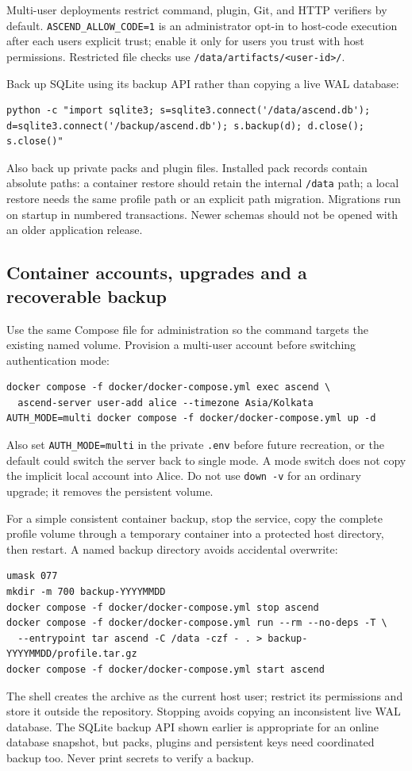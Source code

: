 Multi-user deployments restrict command, plugin, Git, and HTTP verifiers
by default. \texttt{ASCEND\_ALLOW\_CODE=1} is an administrator opt-in to
host-code execution after each user\textquotesingle s explicit trust;
enable it only for users you trust with host permissions. Restricted
file checks use
\texttt{/data/artifacts/\textless{}user-id\textgreater{}/}.

Back up SQLite using its backup API rather than copying a live WAL
database:

\begin{verbatim}
python -c "import sqlite3; s=sqlite3.connect('/data/ascend.db'); d=sqlite3.connect('/backup/ascend.db'); s.backup(d); d.close(); s.close()"
\end{verbatim}

Also back up private packs and plugin files. Installed pack records contain
absolute paths: a container restore should retain the internal \texttt{/data}
path; a local restore needs the same profile path or an explicit path migration.
Migrations run on startup in numbered
transactions. Newer schemas should not be opened with an older
application release.

\subsection{Container accounts, upgrades and a recoverable backup}
Use the same Compose file for administration so the command targets the existing
named volume. Provision a multi-user account before switching authentication mode:
\begin{verbatim}
docker compose -f docker/docker-compose.yml exec ascend \
  ascend-server user-add alice --timezone Asia/Kolkata
AUTH_MODE=multi docker compose -f docker/docker-compose.yml up -d
\end{verbatim}
Also set \texttt{AUTH\_MODE=multi} in the private \texttt{.env} before future
recreation, or the default could switch the server back to single mode.
A mode switch does not copy the implicit local account into Alice. Do not use
\texttt{down -v} for an ordinary upgrade; it removes the persistent volume.

For a simple consistent container backup, stop the service, copy the complete
profile volume through a temporary container into a protected host directory,
then restart. A named backup directory avoids accidental overwrite:
\begin{verbatim}
umask 077
mkdir -m 700 backup-YYYYMMDD
docker compose -f docker/docker-compose.yml stop ascend
docker compose -f docker/docker-compose.yml run --rm --no-deps -T \
  --entrypoint tar ascend -C /data -czf - . > backup-YYYYMMDD/profile.tar.gz
docker compose -f docker/docker-compose.yml start ascend
\end{verbatim}
The shell creates the archive as the current host user; restrict its permissions
and store it outside the repository. Stopping avoids copying an inconsistent
live WAL database. The SQLite backup API shown earlier is appropriate for an
online database snapshot, but packs, plugins and persistent keys need coordinated
backup too. Never print secrets to verify a backup.

